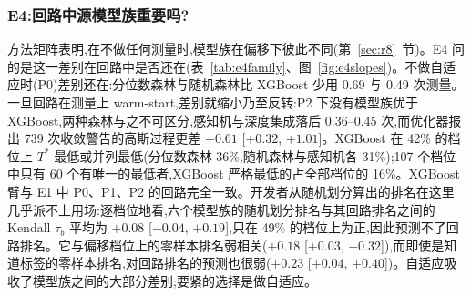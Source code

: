 \documentclass[11pt,a4paper]{ctexart}
\begin{document}
\begin{table}[htbp]
\centering\scriptsize
\caption{E3:两次随机测量之后的决策规则,经五折表轮换学习,并以升级代价 $\lambda$(测量次数等价)计价。成本为 107 个档位(3 个目标 $\times$ 10 个种子)上的平均 $T^{*}$,每次升级加 $\lambda$;共享两行 A 阶段测量的常数臂在每个 $\lambda$ 下的成本为 3.31(继续,warm-start)、3.91(不自适应)与 3.71(切换)(表~\ref{tab:e1policy}中的 P0 不做 A 阶段测量)。"完美决策"为每个单元事后最优动作的成本。当规则在块区间不含 0 的意义上同时优于"总是继续"与"从不自适应"时记为成立。各折规则在漂移 oracle 下相对总是继续的差见正文。每个区间来自各自的 bootstrap 重抽样,因此相同的规则在末位上可能不同。}
\label{tab:e3lambda}
\setlength{\tabcolsep}{3pt}

\end{table}

\subsubsection{E4:回路中源模型族重要吗?}
\label{sec:e4}
方法矩阵表明,在不做任何测量时,模型族在偏移下彼此不同(第~\ref{sec:r8}~节)。E4 问的是这一差别在回路中是否还在(表~\ref{tab:e4family}、图~\ref{fig:e4slopes})。不做自适应时(P0)差别还在:分位数森林与随机森林比 XGBoost 少用 0.69 与 0.49 次测量。一旦回路在测量上 warm-start,差别就缩小乃至反转:P2 下没有模型族优于 XGBoost,两种森林与之不可区分,感知机与深度集成落后 0.36--0.45 次,而优化器报出 739 次收敛警告的高斯过程更差 $+0.61$ [$+0.32$, $+1.01$]。XGBoost 在 42\% 的档位上 $T^{*}$ 最低或并列最低(分位数森林 36\%,随机森林与感知机各 31\%);107 个档位中只有 60 个有唯一的最低者,XGBoost 严格最低的占全部档位的 16\%。XGBoost 臂与 E1 中 P0、P1、P2 的回路完全一致。开发者从随机划分算出的排名在这里几乎派不上用场:逐档位地看,六个模型族的随机划分排名与其回路排名之间的 Kendall $\tau_b$ 平均为 $+0.08$ [$-0.04$, $+0.19$],只在 49\% 的档位上为正,因此预测不了回路排名。它与偏移档位上的零样本排名弱相关($+0.18$ [$+0.03$, $+0.32$]),而即使是知道标签的零样本排名,对回路排名的预测也很弱($+0.23$ [$+0.04$, $+0.40$])。自适应吸收了模型族之间的大部分差别;要紧的选择是做自适应。
\end{document}

